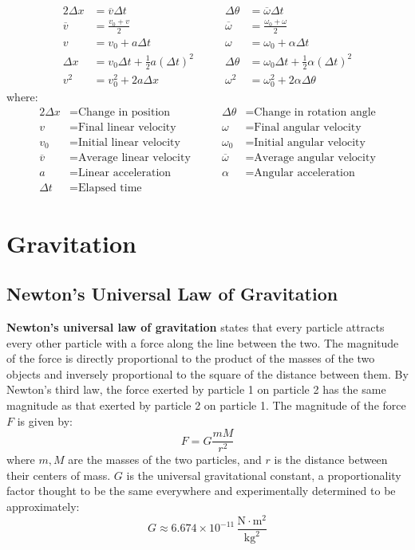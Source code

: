 \documentclass{article}
\newcommand{\theorem}[2]{\begin{tcolorbox}[title={#1},colback=blue!5!white,colframe=blue!75!black,parbox=false] #2 \end{tcolorbox}}
\begin{document}
\theorem{Linear and rotational kinematics equations}{
	\begin{alignat*}{2}
		\Delta x&=\overline v\Delta t & \qquad
		\Delta\theta&=\overline\omega \Delta t \\
		\overline v&=\frac{v_0+v}{2} & \qquad
		\overline \omega&=\frac{\omega_0+\omega}{2} \\
		v&=v_0+a\Delta t & \qquad
		\omega&=\omega_0+\alpha\Delta t \\
		\Delta x&=v_0\Delta t+\frac12a(\Delta t)^2 & \qquad
		\Delta \theta&=\omega_0\Delta t+\frac12\alpha (\Delta t)^2 \\
		v^2&=v_0^2+2a\Delta x & \qquad
		\omega^2&=\omega_0^2+2\alpha\Delta \theta
	\end{alignat*}
	where:
	\begin{alignat*}{2}
		\Delta x&=\text{Change in position} & \qquad
		\Delta \theta&=\text{Change in rotation angle} \\
		v&=\text{Final linear velocity} & \qquad
		\omega&=\text{Final angular velocity} \\
		v_0&=\text{Initial linear velocity} & \qquad
		\omega_0&=\text{Initial angular velocity} \\
		\overline v&=\text{Average linear velocity} & \qquad
		\overline\omega&=\text{Average angular velocity} \\
		a&=\text{Linear acceleration} & \qquad
		\alpha&=\text{Angular acceleration} \\
		\Delta t&=\text{Elapsed time}
	\end{alignat*}
}

\section{Gravitation}

\subsection{Newton's Universal Law of Gravitation}

\theorem{Newton's universal law of gravitation}{\textbf{Newton's universal law of gravitation} states that every particle attracts every other particle with a force along the line between the two. The magnitude of the force is directly proportional to the product of the masses of the two objects and inversely proportional to the square of the distance between them. By Newton's third law, the force exerted by particle 1 on particle 2 has the same magnitude as that exerted by particle 2 on particle 1. The magnitude of the force $F$ is given by:
\begin{equation*}
    F=G \frac{mM}{r^2}
\end{equation*}
where $m,M$ are the masses of the two particles, and $r$ is the distance between their centers of mass. $G$ is the universal gravitational constant, a proportionality factor thought to be the same everywhere and experimentally determined to be approximately:
\begin{equation*}
	G\approx 6.674\times 10^{-11} \,\frac{\si{\newton\cdot\meter\squared}}{\si{\kilogram\squared}}
\end{equation*}}
\end{document}
